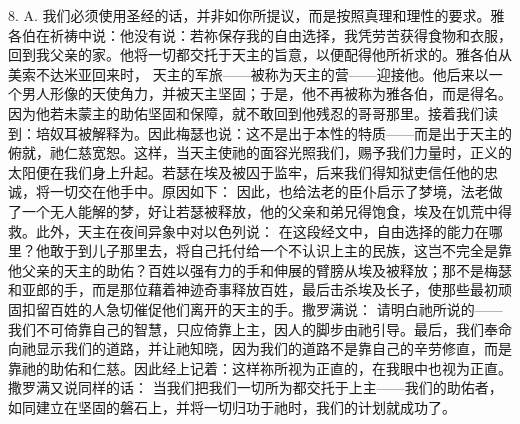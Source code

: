 8. A. 我们必须使用圣经的话，并非如你所提议，而是按照真理和理性的要求。雅各伯在祈祷中说：他没有说：若祢保存我的自由选择，我凭劳苦获得食物和衣服，回到我父亲的家。他将一切都交托于天主的旨意，以便配得他所祈求的。雅各伯从美索不达米亚回来时， 天主的军旅——被称为天主的营——迎接他。他后来以一个男人形像的天使角力，并被天主坚固；于是，他不再被称为雅各伯，而是得名。因为他若未蒙主的助佑坚固和保障，就不敢回到他残忍的哥哥那里。接着我们读到：培奴耳被解释为。因此梅瑟也说：这不是出于本性的特质——而是出于天主的俯就，祂仁慈宽恕。这样，当天主使祂的面容光照我们，赐予我们力量时，正义的太阳便在我们身上升起。若瑟在埃及被囚于监牢，后来我们得知狱吏信任他的忠诚，将一切交在他手中。原因如下： 因此，也给法老的臣仆启示了梦境，法老做了一个无人能解的梦，好让若瑟被释放，他的父亲和弟兄得饱食，埃及在饥荒中得救。此外，天主在夜间异象中对以色列说： 在这段经文中，自由选择的能力在哪里？他敢于到儿子那里去，将自己托付给一个不认识上主的民族，这岂不完全是靠他父亲的天主的助佑？百姓以强有力的手和伸展的臂膀从埃及被释放；那不是梅瑟和亚郎的手，而是那位藉着神迹奇事释放百姓，最后击杀埃及长子，使那些最初顽固扣留百姓的人急切催促他们离开的天主的手。撒罗满说： 请明白祂所说的——我们不可倚靠自己的智慧，只应倚靠上主，因人的脚步由祂引导。最后，我们奉命向祂显示我们的道路，并让祂知晓，因为我们的道路不是靠自己的辛劳修直，而是靠祂的助佑和仁慈。因此经上记着：这样祢所视为正直的，在我眼中也视为正直。撒罗满又说同样的话： 当我们把我们一切所为都交托于上主——我们的助佑者，如同建立在坚固的磐石上，并将一切归功于祂时，我们的计划就成功了。\par

